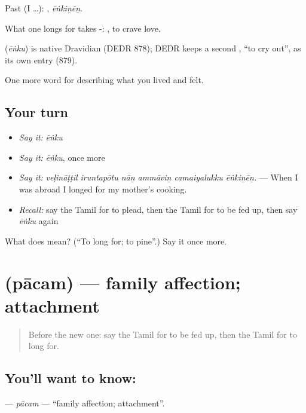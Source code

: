 Past (I …): , \emph{ēṅkiṉēṉ}.

What one longs for takes -:  , to crave love.

\begin{cousinweb}
\textbf{} (\emph{ēṅku}) is native Dravidian (DEDR 878); DEDR keeps a second , \textquotedblleft{}to cry out\textquotedblright{}, as its own entry (879).
\end{cousinweb}

\begin{grammarlens}[title={What you've built}]
One more word for describing what you lived and felt.
\end{grammarlens}

\subsection*{Your turn}
\begin{itemize}
\raggedright
  \item \emph{Say it:} \emph{ēṅku}
  \item \emph{Say it:} \emph{ēṅku}, once more
  \item \emph{Say it:} \emph{veḷināṭṭil iruntapōtu nāṉ ammāviṉ camaiyalukku ēṅkiṉēṉ.} — When I was abroad I longed for my mother’s cooking.
  \item \emph{Recall:} say the Tamil for to plead, then the Tamil for to be fed up, then say \emph{ēṅku} again
\end{itemize}

\begin{tcolorbox}[breakable,colback=teal!4,colframe=teal!35!black,title={Before you move on}]
What does  mean? (\textquotedblleft{}To long for; to pine\textquotedblright{}.) Say it once more.
\end{tcolorbox}
\section[\texorpdfstring{\ta{பாசம்} (pācam)}{பாசம் (pācam)}]{ (pācam) — family affection; attachment}

\label{lesson:TA-C465-pacam}



\begin{quote}
Before the new one: say the Tamil for to be fed up, then the Tamil for to long for.
\end{quote}

\subsection*{You'll want to know: }
\textbf{} — \emph{pācam} — \textquotedblleft{}family affection; attachment\textquotedblright{}.

